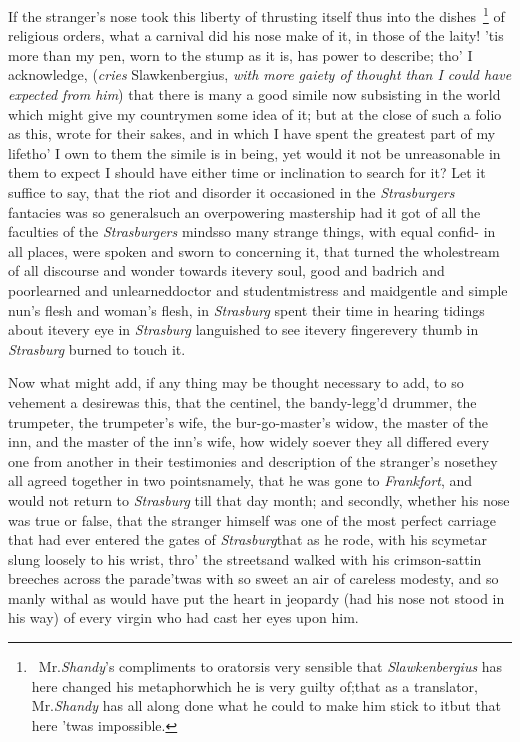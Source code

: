 \documentclass{article}
\begin{document}
If the stranger’s nose took this liberty of thrusting itself thus into
the dishes~\footnote{\ Mr.\@ \textit{Shandy}’s compliments \vrule height 12pt width 0pt
to orators\tsh is very sensible that \textit{Slawkenbergius}
has here changed his metaphor\tsk which he is very guilty
of;\tsk that as a translator, Mr.\@ \textit{Shandy} has all
along done what he could to make him stick to it\tsk but
that here ’twas impossible.}
of religious orders, \etc what a carnival did his nose make of it, in those of the
laity!\break
\tsk ’tis more than my pen, worn to the stump as it is, has power to describe;
tho’ I acknowledge, (\textit{cries} Slawkenbergius,\break
\textit{with more gaiety of
thought than I could have expected from him}) that there is many a good simile now
subsisting in the world which might give my countrymen some idea of it; but at the
close of such a folio as this, wrote for their sakes, and in which I have spent the
greatest part of my life\tsh tho’ I own to them the simile is in being, yet would it
not be unreasonable in them to expect I should have either time or inclination to
search for it? Let it suffice to say, that the riot and disorder it occasioned in
the \textit{Strasburgers} fantacies was so general\tsk such an overpowering mastership
had it got of all the faculties of the \textit{Strasburgers}
minds\tsk so
many strange
things, with equal confid-
in all places,
were spoken and sworn to concerning it, that turned the
whole\break stream of all
discourse and wonder towards it\tsk every soul, good and bad\tsk rich and poor\tsk learned
and unlearned\tsk doctor and student\tsk mistress and maid\tsk gentle and simple\tsk
nun’s flesh and wo\-man’s flesh, in \textit{Strasburg} spent their time in hearing
tidings about it\tsk every eye in \textit{Strasburg}
languished to see it\tsk every
finger\tsk every thumb in \textit{Strasburg} burned to touch it.


Now what might add, if any thing may be thought necessary to
add, to so vehement a desire\tsk was this, that the centinel, the
bandy-legg’d drummer, the trumpeter, the trumpeter’s
wife, the bur-go-master’s widow, the master of the inn, and the
master of the inn’s wife, how widely soever they all
differed every one from another in their testimonies and
description of the stranger’s nose\tsk they all agreed
together in two points\tsk namely, that he was gone to
\textit{Frankfort}, and would not return to
\textit{Strasburg} till that day month; and secondly,
whether his nose was true or false, that the stran\-ger
himself was one of the most perfect 
\break
{}\break
{}
carriage that had ever entered the gates of
\textit{Strasburg}\tsk that as he rode, with his scymetar slung
loosely to his wrist, thro’ the streets\tsk and walked with
his crimson-sattin breeches across the parade\tsk ’twas with
so sweet an air of careless modesty, and so manly withal\tsk
as would have put the heart in jeopardy (had his nose not
stood in his way) of every virgin who had cast her eyes upon
him.
\end{document}

